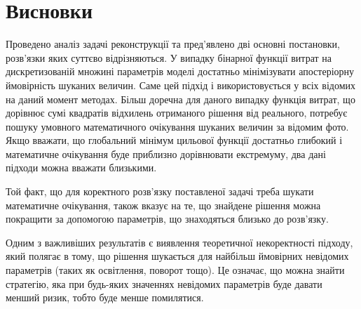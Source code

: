 \section{Висновки}

Проведено аналіз задачі реконструкції та пред'явлено дві основні постановки,
розв'язки яких суттєво відрізняються.
У випадку бінарної функції витрат на дискретизованій множині параметрів моделі
достатньо мінімізувати апостеріорну ймовірність шуканих величин.
Саме цей підхід і використовується у всіх відомих на даний момент методах.
Більш доречна для даного випадку функція витрат,
що дорівнює сумі квадратів відхилень отриманого рішення від реального,
потребує пошуку умовного математичного очікування
шуканих величин за відомим фото.
Якщо вважати,
що глобальний мінімум цильової функції достатньо глибокий
і математичне очікування буде приблизно дорівнювати екстремуму,
два дані підходи можна вважати близькими.

Той факт,
що для коректного розв'язку поставленої задачі треба шукати
математичне очікування,
також вказує на те,
що знайдене рішення можна покращити за допомогою параметрів,
що знаходяться близько до розв'язку.

Одним з важливіших результатів є виявлення теоретичної некоректності підходу,
який полягає в тому,
що рішення шукається для найбільш ймовірних невідомих параметрів
(таких як освітлення, поворот тощо).
Це означає, що можна знайти стратегію,
яка при будь-яких значеннях невідомих параметрів буде давати менший ризик,
тобто буде менше помилятися.
